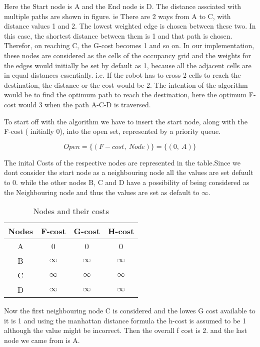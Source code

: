 Here the Start node is A and the End node is D. The distance assciated with multiple paths are shown in figure. ie There are 2 ways from A to C, with distance values 1 and 2. The lowest weighted edge is chosen between these two. In this case, the shortest distance between them is 1 and that path is chosen. Therefor, on reaching C, the G-cost becomes 1 and so on. In our implementation, these nodes are considered as the cells of the occupancy grid and the weights for the edges would initially be set by default as 1, because all the adjacent cells are in equal distances essentially. i.e. If the robot has to cross 2 cells to reach the destination, the distance or the cost would be 2. The intention of the algorithm would be to find the optimum path to reach the destination, here the optimum F-cost would 3 when the path A-C-D is traversed.

To start off with the algorithm we have to insert the start node, along with the F-cost ( initially 0), into the open set, represented by a priority queue. 

\[Open = \{(F-cost, \ Node)\} = \{(0, \ A)\}\]

The inital Costs of the respective nodes are represented in the table.Since we dont consider the start node as a neighbouring node all the values are set defuult to 0. while the other nodes B, C and D have a possibility of being considered as the Neighbouring node and thus the values are set as default to $\infty$. 

\begin{table}[H]
\centering
    \begin{tabular}{ |c|c|c|c| } 
    \hline
    Nodes & F-cost & G-cost & H-cost \\
    \hline 
    A & 0 & 0 & 0\\ 
    B & $\infty$ & $\infty$ & $\infty$\\ 
    C & $\infty$ & $\infty$ & $\infty$\\ 
    D & $\infty$ & $\infty$ & $\infty$\\
    \hline
    \end{tabular}
    \caption{Nodes and their costs}
    \label{table:nodeCost0}
\end{table}

Now the first neighbouring node C is considered and the lowes G cost available to it is 1 and using the manhattan distance formula the h-cost is assumed to be 1 although the value might be incorrect. Then the overall f cost is 2. and the last node we came from is A. 

